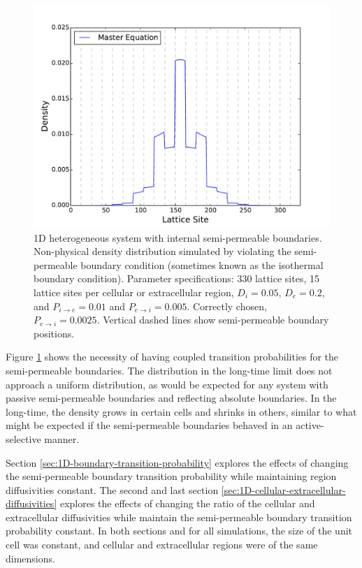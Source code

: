 	\begin{figure}[h]
		\centering
		\includegraphics[width=1.0\linewidth]{../images/1D/11U_heterogeneous_plots_1D_nonphysical}
		\caption{1D heterogeneous system with internal semi-permeable boundaries. Non-physical density distribution simulated by violating the semi-permeable boundary condition (sometimes known as the isothermal boundary condition). Parameter specifications: 330 lattice sites, 15 lattice sites per cellular or extracellular region, $ D_i = 0.05 $, $ D_e = 0.2 $, and $ P_{i\rightarrow e} = 0.01 $ and $ P_{e\rightarrow i} =  0.005 $. Correctly chosen, $ P_{e\rightarrow i} =  0.0025 $. Vertical dashed lines show semi-permeable boundary positions. }
		\label{fig:11U_heterogeneous_plots_1D_nonphysical}
	\end{figure}
	
	\newpage
	Figure \ref{fig:11U_heterogeneous_plots_1D_nonphysical} shows the necessity of having coupled transition probabilities for the semi-permeable boundaries. The distribution in the long-time limit does not approach a uniform distribution, as would be expected for any system with passive semi-permeable boundaries and reflecting absolute boundaries. In the long-time, the density grows in certain cells and shrinks in others, similar to what might be expected if the semi-permeable boundaries behaved in an active-selective manner. 
	
	\newpage
	Section \ref{sec:1D-boundary-transition-probability} explores the effects of changing the semi-permeable boundary transition probability while maintaining region diffusivities constant. The second and last section \ref{sec:1D-cellular-extracellular-diffusivities} explores the effects of changing the ratio of the cellular and extracellular diffusivities while maintain the semi-permeable boundary transition probability constant.	In both sections and for all simulations, the size of the unit cell was constant, and cellular and extracellular regions were of the same dimensions.
	
